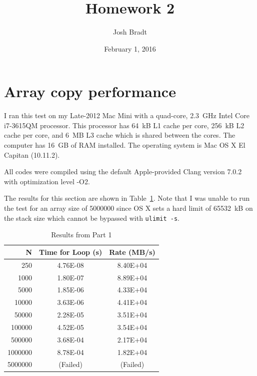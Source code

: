 \documentclass{article}
\title{Homework 2}
\author{Josh Bradt}
\date{February 1, 2016}
\begin{document}
\maketitle

\section{Array copy performance}

I ran this test on my Late-2012 Mac Mini with a quad-core, \SI{2.3}{GHz} Intel Core i7-3615QM processor. This processor has \SI{64}{kB} L1 cache per core, \SI{256}{kB} L2 cache per core, and \SI{6}{MB} L3 cache which is shared between the cores. The computer has \SI{16}{GB} of RAM installed. The operating system is Mac OS X El Capitan (10.11.2).

All codes were compiled using the default Apple-provided Clang version 7.0.2 with optimization level -O2.

The results for this section are shown in Table~\ref{tab:part1}. Note that I was unable to run the test for an array size of \num{5000000} since OS X sets a hard limit of \SI{65532}{kB} on the stack size which cannot be bypassed with \texttt{ulimit -s}.

\begin{table}[b]
\centering
\begin{tabular}{@{}rcc@{}}
\toprule
N         & Time for Loop (s) & Rate (MB/s) \\ \midrule
\num{250}       & \num{4.76E-08}          & \num{8.40E+04}    \\
\num{1000}     & \num{1.80E-07}          & \num{8.89E+04}    \\
\num{5000}     & \num{1.85E-06}          & \num{4.33E+04}    \\
\num{10000}    & \num{3.63E-06}          & \num{4.41E+04}    \\
\num{50000}    & \num{2.28E-05}          & \num{3.51E+04}    \\
\num{100000}   & \num{4.52E-05}          & \num{3.54E+04}    \\
\num{500000}   & \num{3.68E-04}          & \num{2.17E+04}    \\
\num{1000000} & \num{8.78E-04}          & \num{1.82E+04}    \\
\num{5000000} & (Failed)          & (Failed)    \\ \bottomrule
\end{tabular}
\caption{Results from Part 1}
\label{tab:part1}
\end{table}
\end{document}

